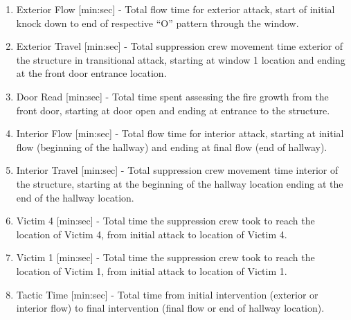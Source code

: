 \documentclass[12pt,oneside]{book}
\begin{document}
\begin{enumerate}{}
\item Exterior Flow [min:sec] - Total flow time for exterior attack, start of initial knock down to end of respective ``O'' pattern through the window. 
\item Exterior Travel [min:sec] - Total suppression crew movement time exterior of the structure in transitional attack, starting at window 1 location and ending at the front door entrance location. \\
\item Door Read [min:sec] - Total time spent assessing the fire growth from the front door, starting at door open and ending at entrance to the structure. \\
\item Interior Flow [min:sec] - Total flow time for interior attack, starting at initial flow (beginning of the hallway) and ending at final flow (end of hallway). \\
\item Interior Travel [min:sec] - Total suppression crew movement time interior of the structure, starting at the beginning of the hallway location ending at the end of the hallway location. \\
\item Victim 4 [min:sec] - Total time the suppression crew took to reach the location of Victim 4, from initial attack to location of Victim 4. \\
\item Victim 1 [min:sec] - Total time the suppression crew took to reach the location of Victim 1, from initial attack to location of Victim 1. \\
\item Tactic Time [min:sec] - Total time from initial intervention (exterior or interior flow) to final intervention (final flow or end of hallway location). \\
\end{enumerate}


\end{document}
